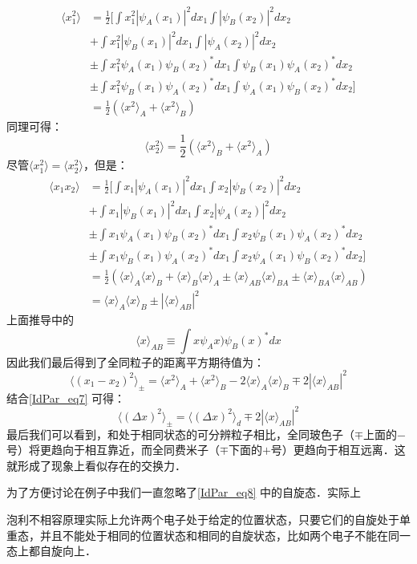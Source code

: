 \begin{itemize}
\begin{align}
\langle x_1^2\rangle &= \frac{1}{2}\big[\int x_1^2|\psi_A(x_1)|^2dx_1\int |\psi_B(x_2)|^2dx_2\\
&+\int x_1^2|\psi_B(x_1)|^2dx_1\int |\psi_A(x_2)|^2dx_2\\ 
&\pm\int x_1^2\psi_A(x_1)\psi_B(x_2)^*dx_1\int \psi_B(x_1)\psi_A(x_2)^*dx_2\\
&\pm\int x_1^2\psi_B(x_1)\psi_A(x_2)^*dx_1\int \psi_A(x_1)\psi_B(x_2)^*dx_2\big]\\
&=\frac{1}{2}(\langle x^2\rangle_A+\langle x^2\rangle_B)
\end{align}
同理可得：
\begin{equation}
\langle x_2^2\rangle=\frac{1}{2}(\langle x^2\rangle_B+\langle x^2\rangle_A)
\end{equation}
尽管$\langle x_1^2\rangle=\langle x_2^2\rangle$，但是：
\begin{align}
\langle x_1x_2\rangle &= \frac{1}{2}\big[\int x_1|\psi_A(x_1)|^2dx_1\int x_2 |\psi_B(x_2)|^2dx_2\\
&+\int x_1|\psi_B(x_1)|^2dx_1\int x_2|\psi_A(x_2)|^2dx_2\\ 
&\pm\int x_1\psi_A(x_1)\psi_B(x_2)^*dx_1\int x_2\psi_B(x_1)\psi_A(x_2)^*dx_2\\
&\pm\int x_1\psi_B(x_1)\psi_A(x_2)^*dx_1\int x_2\psi_A(x_1)\psi_B(x_2)^*dx_2\big]\\
&=\frac{1}{2}\left(\langle x\rangle_A\langle x\rangle_B+\langle x\rangle_B\langle x\rangle_A\pm\langle x\rangle_{AB}\langle x\rangle_{BA}\pm\langle x\rangle_{BA}\langle x\rangle_{AB}\right)\\
&=\langle x\rangle_A\langle x\rangle_B\pm|\langle x\rangle_{AB}|^2
\end{align}
上面推导中的\begin{equation}
\langle x\rangle_{AB}\equiv \int x\psi_Ax)\psi_B(x)^*dx
\end{equation}
因此我们最后得到了全同粒子的距离平方期待值为：
\begin{equation}
\langle (x_1-x_2)^2\rangle_\pm=\langle x^2\rangle_A+\langle x^2\rangle_B-2\langle x\rangle_A\langle x\rangle_B\mp 2|\langle x\rangle_{AB}|^2
\end{equation}
结合\autoref{IdPar_eq7} 可得：
\begin{equation}
\langle (\Delta x)^2\rangle_\pm=\langle (\Delta x)^2\rangle_d\mp 2|\langle x\rangle_{AB}|^2
\end{equation}
最后我们可以看到，和处于相同状态的可分辨粒子相比，全同玻色子（$\mp$上面的$-$号）将更趋向于相互靠近，而全同费米子（$\mp$下面的$+$号）更趋向于相互远离．这就形成了现象上看似存在的交换力．
\end{itemize}

为了方便讨论在例子中我们一直忽略了\autoref{IdPar_eq8} 中的自旋态．实际上

泡利不相容原理实际上允许两个电子处于给定的位置状态，只要它们的自旋处于单重态，并且不能处于相同的位置状态和相同的自旋状态，比如两个电子不能在同一态上都自旋向上．